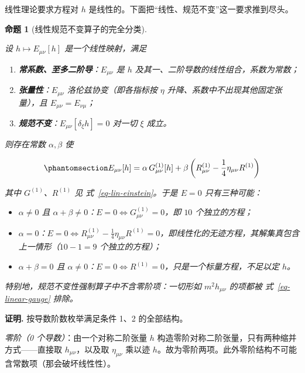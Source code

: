 \documentclass[
  chinese,
  a4paper,
  UTF8,
  12pt,
  oneside,
  openany]{ctexbook}
\providecommand{\tightlist}{%
  \setlength{\itemsep}{0pt}\setlength{\parskip}{0pt}}
\theoremstyle{plain}
\theoremstyle{plain}
\theoremstyle{plain}
\newtheorem{proposition}{命题}[chapter]
\theoremstyle{definition}
\theoremstyle{plain}
\theoremstyle{plain}
\theoremstyle{remark}
\begin{document}
线性理论要求方程对 \(h\)
是线性的。下面把``线性、规范不变''这一要求推到尽头。

\begin{proposition}[线性规范不变算子的完全分类]\protect\hypertarget{prp-fierz-pauli}{}\label{prp-fierz-pauli}

设 \(h\mapsto E_{\mu\nu}[h]\) 是一个线性映射，满足

\begin{enumerate}
\def\labelenumi{\arabic{enumi}.}
\tightlist
\item
  \textbf{常系数、至多二阶导}：\(E_{\mu\nu}\) 是 \(h\)
  及其一、二阶导数的线性组合，系数为常数；
\item
  \textbf{张量性}：\(E_{\mu\nu}\) 洛伦兹协变（即各指标按 \(\eta\)
  升降、系数中不出现其他固定张量），且 \(E_{\mu\nu}=E_{\nu\mu}\)；
\item
  \textbf{规范不变}：\(E_{\mu\nu}[\delta_{\xi}h]=0\) 对一切 \(\xi\)
  成立。
\end{enumerate}

则存在常数 \(\alpha,\beta\) 使

\begin{equation}\protect\phantomsection\label{eq-fp-general}{
E_{\mu\nu}[h]
= \alpha\,G^{(1)}_{\mu\nu}[h]
+\beta\left(R^{(1)}_{\mu\nu}-\frac{1}{4}\eta_{\mu\nu}R^{(1)}\right)
}\end{equation}

其中 \(G^{(1)}\)、\(R^{(1)}\) 见 式~\ref{eq-lin-einstein}。于是 \(E=0\)
只有三种可能：

\begin{itemize}
\tightlist
\item
  \(\alpha\neq0\) 且
  \(\alpha+\beta\neq0\)：\(E=0\iff G^{(1)}_{\mu\nu}=0\)，即 \(10\)
  个独立的方程；
\item
  \(\alpha=0\)：\(E=0\iff R^{(1)}_{\mu\nu}-\frac{1}{4}\eta_{\mu\nu}R^{(1)}=0\)，即线性化的无迹方程，其解集真包含上一情形（\(10-1=9\)
  个独立的方程）；
\item
  \(\alpha+\beta=0\) 且
  \(\alpha\neq0\)：\(E=0\iff R^{(1)}=0\)，只是一个标量方程，不足以定
  \(h\)。
\end{itemize}

特别地，规范不变性强制算子中不含零阶项：一切形如 \(m^{2}h_{\mu\nu}\)
的项都被 式~\ref{eq-linear-gauge} 排除。

\end{proposition}

\textbf{证明.} 按导数阶数枚举满足条件 1、2 的全部结构。

\emph{零阶（0 个导数）}：由一个对称二阶张量 \(h\)
构造零阶对称二阶张量，只有两种缩并方式------直接取
\(h_{\mu\nu}\)，以及取 \(\eta_{\mu\nu}\) 乘以迹
\(h\)。故为零阶两项。此外零阶结构不可能含常数项（那会破坏线性性）。
\end{document}
